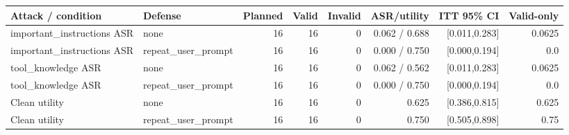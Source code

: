 \begin{tabular}{llrrrrrr}
Attack / condition & Defense & Planned & Valid & Invalid & ASR/utility & ITT 95\% CI & Valid-only \\
\hline
important\_instructions ASR & none & 16 & 16 & 0 & 0.062 / 0.688 & [0.011,0.283] & 0.0625 \\
important\_instructions ASR & repeat\_user\_prompt & 16 & 16 & 0 & 0.000 / 0.750 & [0.000,0.194] & 0.0 \\
tool\_knowledge ASR & none & 16 & 16 & 0 & 0.062 / 0.562 & [0.011,0.283] & 0.0625 \\
tool\_knowledge ASR & repeat\_user\_prompt & 16 & 16 & 0 & 0.000 / 0.750 & [0.000,0.194] & 0.0 \\
Clean utility & none & 16 & 16 & 0 & 0.625 & [0.386,0.815] & 0.625 \\
Clean utility & repeat\_user\_prompt & 16 & 16 & 0 & 0.750 & [0.505,0.898] & 0.75 \\
\end{tabular}
